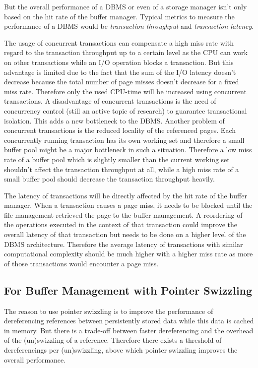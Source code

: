 	But the overall performance of a DBMS or even of a storage manager isn't only based on the hit rate of the buffer manager. Typical metrics to measure the performance of a DBMS would be \emph{transaction throughput} and \emph{transaction latency}.
	
	The usage of concurrent transactions can compensate a high miss rate with regard to the transaction throughput up to a certain level as the CPU can work on other transactions while an I/O operation blocks a transaction. But this advantage is limited due to the fact that the sum of the I/O latency doesn't decrease because the total number of page misses doesn't decrease for a fixed miss rate. Therefore only the used CPU-time will be increased using concurrent transactions. A disadvantage of concurrent transactions is the need of concurrency control (still an active topic of research) to guarantee transactional isolation. This adds a new bottleneck to the DBMS. Another problem of concurrent transactions is the reduced locality of the referenced pages. Each concurrently running transaction has its own working set and therefore a small buffer pool might be a major bottleneck in such a situation. Therefore a low miss rate of a buffer pool which is slightly smaller than the current working set shouldn't affect the transaction throughput at all, while a high miss rate of a small buffer pool should decrease the transaction throughput heavily.
	
	The latency of transactions will be directly affected by the hit rate of the buffer manager. When a transaction causes a page miss, it needs to be blocked until the file management retrieved the page to the buffer management. A reordering of the operations executed in the context of that transaction could improve the overall latency of that transaction but needs to be done on a higher level of the DBMS architecture. Therefore the average latency of transactions with similar computational complexity should be much higher with a higher miss rate as more of those transactions would encounter a page miss.
	
\subsection{For Buffer Management with Pointer Swizzling}

	The reason to use pointer swizzling is to improve the performance of dereferencing references between persistently stored data while this data is cached in memory. But there is a trade-off between faster dereferencing and the overhead of the (un)swizzling of a reference. Therefore there exists a threshold of dereferencings per (un)swizzling, above which pointer swizzling improves the overall performance.
	
